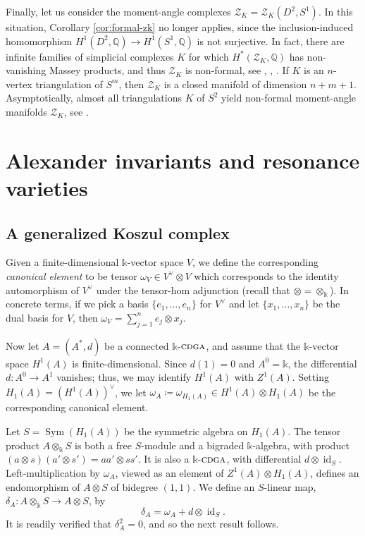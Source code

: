 \documentclass{article}
\numberwithin{equation}{section}
\theoremstyle{definition}
\newcommand{\Q}{\mathbb{Q}}
\renewcommand{\k}{\mathbb{k}}
\newcommand{\ZZ}{{\mathcal{Z}}}
\newcommand{\cdga}{\ensuremath{\textsc{cdga}}}
\DeclareMathOperator{\id}{id}
\DeclareMathOperator{\Sym}{Sym}
\begin{document}
Finally, let us consider the moment-angle complexes 
$\ZZ_{K}=\ZZ_{K}(D^2,S^1)$. In this situation, 
Corollary \ref{cor:formal-zk} no longer applies, since 
the inclusion-induced homomorphism $H^1(D^2,\Q) \to H^1(S^1,\Q)$ 
is not surjective. In fact, there are infinite families 
of simplicial complexes $K$ for which $H^*(\ZZ_{K},\Q)$ 
has non-vanishing Massey products, and thus $\ZZ_K$ 
is non-formal, see \cite{Baskakov}, \cite{DeS07}, \cite{GL21}. 
If $K$ is an $n$-vertex triangulation of $S^{m}$, 
then $\ZZ_K$ is a closed manifold of dimension $n+m+1$. 
Asymptotically, almost all triangulations $K$ of $S^2$ 
yield non-formal moment-angle manifolds $\ZZ_K$, 
see \cite{DeS07}.


\section{Alexander invariants and resonance varieties}
\label{sect:alex-res}

\subsection{A generalized Koszul complex}
\label{subsec:univ aomoto}
Given a finite-dimensional $\k$-vector space $V$, 
we define the corresponding {\em canonical element}\/ to be tensor 
$\omega_{V} \in V^{\vee} \otimes V$ 
which corresponds to the identity automorphism 
of $V^{\vee}$ under the tensor-hom adjunction 
(recall that $\otimes=\otimes_{\k}$). 
In concrete terms, if we pick a basis $\{e_1,\dots ,e_n\}$ for $V^{\vee}$ 
and let $\{x_1,\dots ,x_n\}$ be the dual basis for $V$, 
then $\omega_V=\sum_{j=1}^n e_j\otimes x_j$.

Now let $A=(A^{*},d)$ be a connected $\k$-$\cdga$, 
and assume that the $\k$-vector space $H^1(A)$ 
is finite-dimensional.
Since $d(1)=0$ and $A^0=\k$, the differential 
$d\colon A^0\to A^1$ vanishes; thus, we may 
identify $H^1(A)$ with $Z^1(A)$.
Setting $H_1(A)=(H^1(A))^{\vee}$, 
we let $\omega_A\coloneqq \omega_{H_1(A)} \in 
H^1(A)\otimes H_1(A)$ 
be the corresponding canonical element.

Let $S=\Sym(H_1(A))$ be the symmetric algebra on $H_1(A)$. 
The tensor product $A\otimes_{\k} S$ is both a free $S$-module and 
a bigraded $\k$-algebra, with product $(a\otimes s)(a'\otimes s')=aa'\otimes ss'$. 
It is also a $\k$-$\cdga$, with differential $d \otimes \id_S$. 
Left-multiplication by $\omega_A$, viewed as an element of $Z^1(A)\otimes H_1(A)$, 
defines an endomorphism of $A\otimes S$ of bidegree $(1,1)$. 
We define an $S$-linear map, $\delta_A\colon A\otimes_{\k} S\to A\otimes S$, by 
\begin{equation}
\label{eq:delta-a}
\delta_A = \omega_A  + d \otimes \id_S .
\end{equation}
It is readily verified that $\delta_A^2=0$, and so the next result follows.
\end{document}

